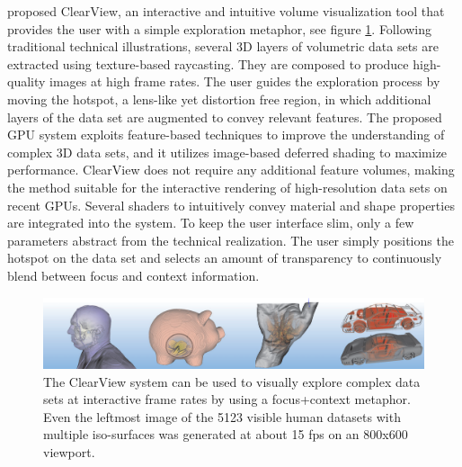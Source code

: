   
\cite{4015450} proposed ClearView, an interactive and intuitive volume
visualization tool that provides the user with a simple exploration
metaphor, see figure \ref{fig:clearview}. Following traditional technical illustrations, several 3D
layers of volumetric data sets are extracted using texture-based raycasting.
They are composed to produce high-quality images at high
frame rates. The user guides the exploration process by moving the
hotspot, a lens-like yet distortion free region, in which additional layers
of the data set are augmented to convey relevant features. The proposed
GPU system exploits feature-based techniques to improve the
understanding of complex 3D data sets, and it utilizes image-based
deferred shading to maximize performance. ClearView does not require
any additional feature volumes, making the method suitable for
the interactive rendering of high-resolution data sets on recent GPUs.
Several shaders to intuitively convey material and shape properties are
integrated into the system. To keep the user interface slim, only a few
parameters abstract from the technical realization. The user simply
positions the hotspot on the data set and selects an amount of transparency
to continuously blend between focus and context information.
\begin{figure}
\centering
\includegraphics[width=\textwidth]{Figures/clearview}
\decoRule
\caption[ clearview]{ The ClearView system can be used to visually explore complex data sets at interactive frame rates by using a focus+context metaphor. Even the leftmost image
of the 5123 visible human datasets with multiple iso-surfaces was generated at about 15 fps on an 800x600 viewport.}
\label{fig:clearview}
\end{figure}

